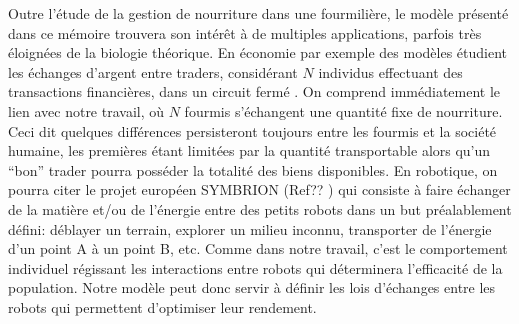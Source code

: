  
Outre l'étude de la gestion de nourriture dans une fourmilière, le modèle présenté dans ce mémoire trouvera son intérêt à de multiples applications, parfois très éloignées de la biologie théorique. En économie par exemple des modèles étudient les échanges d'argent entre traders, considérant $N$ individus effectuant des transactions financières, dans un circuit fermé \citep{lopez-ruiz_complex_2012}. On comprend immédiatement le lien avec notre travail, où $N$ fourmis s'échangent une quantité fixe de nourriture. Ceci dit quelques différences persisteront toujours entre les fourmis et la société humaine, les premières étant limitées par la quantité transportable alors qu'un ``bon'' trader pourra posséder la totalité des biens disponibles. En robotique, on pourra citer le projet européen SYMBRION (Ref?? \fixme) qui consiste à faire échanger de la matière et/ou de l'énergie entre des petits robots dans un but préalablement défini: déblayer un terrain, explorer un milieu inconnu, transporter de l'énergie d'un point A à un point B, etc. Comme dans notre travail, c'est le comportement individuel régissant les interactions entre robots qui déterminera l'efficacité de la population. Notre modèle peut donc servir à définir les lois d'échanges entre les robots qui permettent d'optimiser leur rendement.
